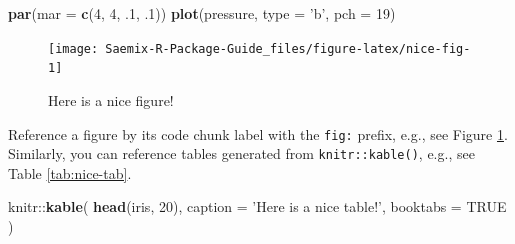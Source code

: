 \documentclass[]{book}
\newenvironment{Shaded}{\begin{snugshade}}{\end{snugshade}}
\newcommand{\KeywordTok}[1]{\textcolor[rgb]{0.13,0.29,0.53}{\textbf{{#1}}}}
\newcommand{\DataTypeTok}[1]{\textcolor[rgb]{0.13,0.29,0.53}{{#1}}}
\newcommand{\DecValTok}[1]{\textcolor[rgb]{0.00,0.00,0.81}{{#1}}}
\newcommand{\StringTok}[1]{\textcolor[rgb]{0.31,0.60,0.02}{{#1}}}
\newcommand{\OtherTok}[1]{\textcolor[rgb]{0.56,0.35,0.01}{{#1}}}
\newcommand{\NormalTok}[1]{{#1}}
\begin{document}
\begin{Shaded}
\begin{Highlighting}[]
\KeywordTok{par}\NormalTok{(}\DataTypeTok{mar =} \KeywordTok{c}\NormalTok{(}\DecValTok{4}\NormalTok{, }\DecValTok{4}\NormalTok{, .}\DecValTok{1}\NormalTok{, .}\DecValTok{1}\NormalTok{))}
\KeywordTok{plot}\NormalTok{(pressure, }\DataTypeTok{type =} \StringTok{'b'}\NormalTok{, }\DataTypeTok{pch =} \DecValTok{19}\NormalTok{)}
\end{Highlighting}
\end{Shaded}

\begin{figure}

{\centering \texttt{[image: Saemix-R-Package-Guide\_files/figure-latex/nice-fig-1]} 

}

\caption{Here is a nice figure!}\label{fig:nice-fig}
\end{figure}

Reference a figure by its code chunk label with the \texttt{fig:}
prefix, e.g., see Figure \ref{fig:nice-fig}. Similarly, you can
reference tables generated from \texttt{knitr::kable()}, e.g., see Table
\ref{tab:nice-tab}.

\begin{Shaded}
\begin{Highlighting}[]
\NormalTok{knitr::}\KeywordTok{kable}\NormalTok{(}
  \KeywordTok{head}\NormalTok{(iris, }\DecValTok{20}\NormalTok{), }\DataTypeTok{caption =} \StringTok{'Here is a nice table!'}\NormalTok{,}
  \DataTypeTok{booktabs =} \OtherTok{TRUE}
\NormalTok{)}
\end{Highlighting}
\end{Shaded}
\end{document}
